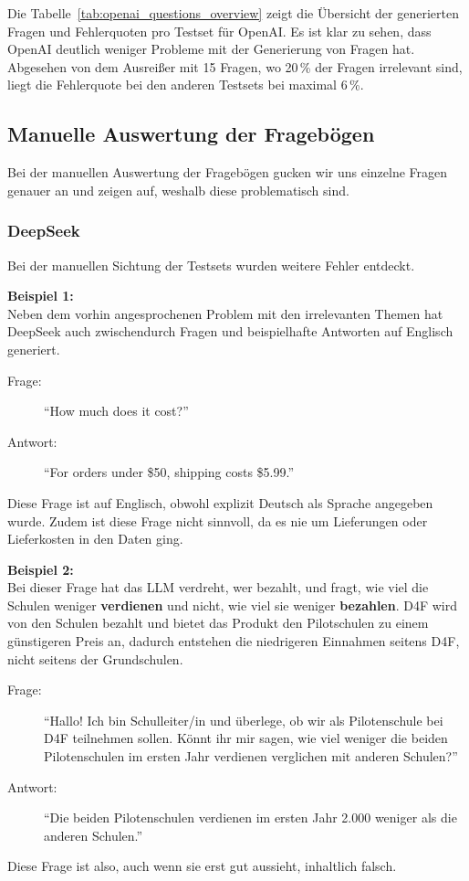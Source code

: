 Die Tabelle~\ref{tab:openai_questions_overview} zeigt die Übersicht der generierten Fragen und Fehlerquoten pro Testset für OpenAI.
Es ist klar zu sehen, dass OpenAI deutlich weniger Probleme mit der Generierung von Fragen hat.
Abgesehen von dem Ausreißer mit 15 Fragen, wo 20\,\% der Fragen irrelevant sind, liegt die Fehlerquote bei den anderen Testsets bei maximal 6\,\%.


\subsection{Manuelle Auswertung der Fragebögen}\label{subsec:manuelle-auswertung-der-fragebogen}

Bei der manuellen Auswertung der Fragebögen gucken wir uns einzelne Fragen genauer an und zeigen auf, weshalb diese problematisch sind.

\subsubsection{DeepSeek}

Bei der manuellen Sichtung der Testsets wurden weitere Fehler entdeckt.

\textbf{Beispiel 1:}\\
Neben dem vorhin angesprochenen Problem mit den irrelevanten Themen hat DeepSeek auch zwischendurch Fragen und beispielhafte Antworten auf Englisch generiert.
\begin{description}
    \item[Frage:] \enquote{How much does it cost?}
    \item[Antwort:] \enquote{For orders under \$50, shipping costs \$5.99.}
\end{description}

Diese Frage ist auf Englisch, obwohl explizit Deutsch als Sprache angegeben wurde. Zudem ist diese Frage nicht sinnvoll, da es nie um Lieferungen oder Lieferkosten in den Daten ging.

\textbf{Beispiel 2:}\\
Bei dieser Frage hat das LLM verdreht, wer bezahlt, und fragt, wie viel die Schulen weniger \textbf{verdienen} und nicht, wie viel sie weniger \textbf{bezahlen}.
D4F wird von den Schulen bezahlt und bietet das Produkt den Pilotschulen zu einem günstigeren Preis an, dadurch entstehen die niedrigeren Einnahmen seitens D4F, nicht seitens der Grundschulen.

\begin{description}
    \item[Frage:] \enquote{Hallo! Ich bin Schulleiter/in und überlege, ob wir als Pilotenschule bei D4F teilnehmen sollen. Könnt ihr mir sagen, wie viel weniger die beiden Pilotenschulen im ersten Jahr verdienen verglichen mit anderen Schulen?}\\
    \item[Antwort:] \enquote{Die beiden Pilotenschulen verdienen im ersten Jahr 2.000 \texteuro{} weniger als die anderen Schulen.}
\end{description}
Diese Frage ist also, auch wenn sie erst gut aussieht, inhaltlich falsch.

